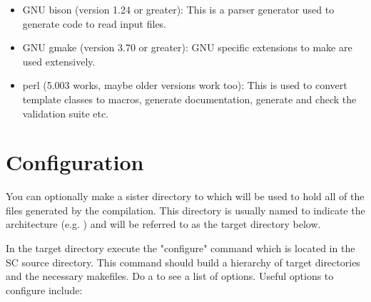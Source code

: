 \begin{itemize}
    \item GNU bison (version 1.24 or greater): This is a parser generator used
          to generate code to read input files.

    \item GNU gmake (version 3.70 or greater): GNU specific extensions to make
          are used extensively.

    \item perl (5.003 works, maybe older versions work too): This is used to
          convert template classes to macros, generate documentation,
          generate and check the validation suite etc.

  \end{itemize}

\section{Configuration}

 You can optionally make a sister directory to  which will be
used to hold all of the files generated by the compilation.  This directory
is usually named to indicate the architecture (e.g. )
and will be referred to as the target directory below.

 In the target directory execute the "configure" command which is located
in the SC source directory. This command should build a hierarchy of
target directories and the necessary makefiles. Do a  to see a list of options.  Useful options to configure
include:

